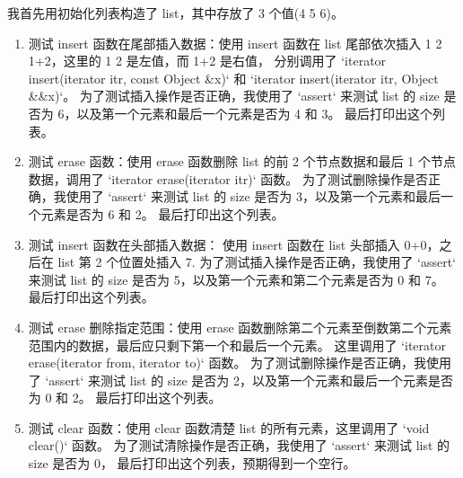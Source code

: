 \documentclass[UTF8]{ctexart}
\begin{document}
我首先用初始化列表构造了 list，其中存放了 3 个值(4 5 6)。

\begin{enumerate}
    \item 测试 insert 函数在尾部插入数据：使用 insert 函数在 list 尾部依次插入 1 2 1+2，这里的 1 2 是左值，而 1+2 是右值，
分别调用了 `iterator insert(iterator itr, const Object \&x)` 和 `iterator insert(iterator itr, Object \&\&x)`。
为了测试插入操作是否正确，我使用了 `assert` 来测试 list 的 size 是否为 6，以及第一个元素和最后一个元素是否为 4 和 3。
最后打印出这个列表。

    \item 测试 erase 函数：使用 erase 函数删除 list 的前 2 个节点数据和最后 1 个节点数据，调用了 `iterator erase(iterator itr)` 函数。
为了测试删除操作是否正确，我使用了 `assert` 来测试 list 的 size 是否为 3，以及第一个元素和最后一个元素是否为 6 和 2。
最后打印出这个列表。

    \item 测试 insert 函数在头部插入数据： 使用 insert 函数在 list 头部插入 0+0，之后在 list 第 2 个位置处插入 7. 
为了测试插入操作是否正确，我使用了 `assert` 来测试 list 的 size 是否为 5，以及第一个元素和第二个元素是否为 0 和 7。
最后打印出这个列表。

    \item 测试 erase 删除指定范围：使用 erase 函数删除第二个元素至倒数第二个元素范围内的数据，最后应只剩下第一个和最后一个元素。
这里调用了 `iterator erase(iterator from, iterator to)` 函数。
为了测试删除操作是否正确，我使用了 `assert` 来测试 list 的 size 是否为 2，以及第一个元素和最后一个元素是否为 0 和 2。
最后打印出这个列表。

    \item 测试 clear 函数：使用 clear 函数清楚 list 的所有元素，这里调用了 `void clear()` 函数。
为了测试清除操作是否正确，我使用了 `assert` 来测试 list 的 size 是否为 0，
最后打印出这个列表，预期得到一个空行。
\end{enumerate}
\end{document}
